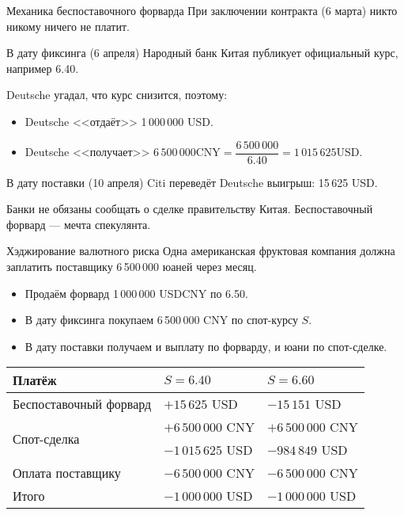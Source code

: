 \documentclass{beamer}
\begin{document}
\begin{frame}{Механика беспоставочного форварда}
\justify
При заключении контракта (6 марта) никто никому ничего не платит.

\justify
В дату фиксинга (6 апреля) Народный банк Китая публикует официальный курс, например 6.40.

\justify
Deutsche угадал, что курс снизится, поэтому:
\begin{itemize}
\justifying
\item Deutsche <<отдаёт>> 1\,000\,000 USD.
\item Deutsche <<получает>> $6\,500\,000 \text{CNY} = \dfrac{6\,500\,000}{6.40} = 1\,015\,625 \text{USD}$.
\end{itemize}

\justify
В дату поставки (10 апреля) Citi переведёт Deutsche выигрыш: 15\,625 USD.

\justify Банки не обязаны сообщать о сделке правительству Китая. Беспоставочный форвард --- мечта спекулянта.
\end{frame}



\begin{frame}{Хэджирование валютного риска}
\justify
Одна американская фруктовая компания должна заплатить поставщику 6\,500\,000 юаней через месяц.
\begin{itemize}
\item Продаём форвард 1\,000\,000 USDCNY по 6.50.
\item В дату фиксинга покупаем 6\,500\,000 CNY по спот-курсу $S$.
\item В дату поставки получаем и выплату по форварду, и юани по спот-сделке.
\end{itemize}

\justify
\centering
\begin{tabular}{l|l|l}
		Платёж 				& $S=6.40$ 			& $S=6.60$ \\
		\hline
		Беспоставочный форвард 	& $+15\,625$ USD 		& $-15\,151$ USD \\
		\hline
		\multirow{2}{*}{Спот-сделка} & $+6\,500\,000$ CNY 	& $+6\,500\,000$ CNY \\
				   			& $-1\,015\,625$ USD		& $-984\,849$ USD \\
		\hline
		Оплата поставщику 		& $-6\,500\,000$ CNY 	& $-6\,500\,000$ CNY \\ 
		 \hline
		Итого				& $-1\,000\,000$ USD 	& $-1\,000\,000$ USD
\end{tabular}
\end{frame}
\end{document}
